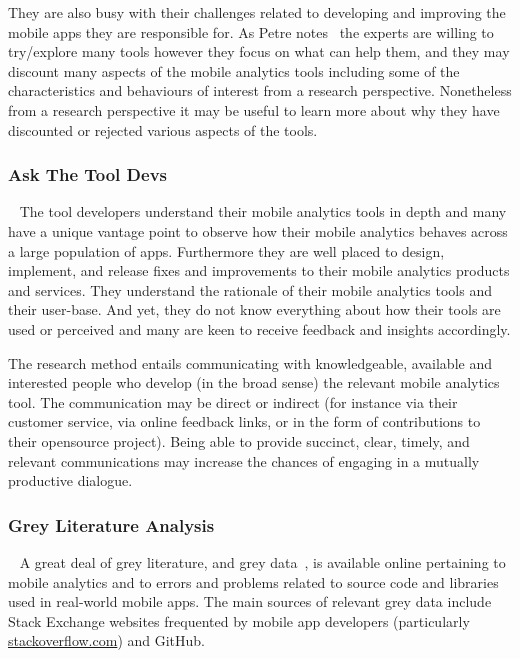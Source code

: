They are also busy with their challenges related to developing and improving the mobile apps they are responsible for. As Petre notes~\citealt{petre2009_insights_from_expert_software_design_practice} the experts are willing to try/explore many tools however they focus on what can help them, and they may discount many aspects of the mobile analytics tools including some of the characteristics and behaviours of interest from a research perspective. Nonetheless from a research perspective it may be useful to learn more about why they have discounted or rejected various aspects of the tools. 

\subsubsection{Ask The Tool Devs}~\label{section-ask-the-tool-devs-research-method} 
The tool developers understand their mobile analytics tools in depth and many have a unique vantage point to observe how their mobile analytics behaves across a large population of apps. Furthermore they are well placed to design, implement, and release fixes and improvements to their mobile analytics products and services. They understand the rationale of their mobile analytics tools and their user-base. And yet, they do not know everything about how their tools are used or perceived and many are keen to receive feedback and insights accordingly.

The research method entails communicating with knowledgeable, available and interested people who develop (in the broad sense) the relevant mobile analytics tool. The communication may be direct or indirect (for instance via their customer service, via online feedback links, or in the form of contributions to their opensource project). Being able to provide succinct, clear, timely, and relevant communications may increase the chances of engaging in a mutually productive dialogue.

\subsubsection{Grey Literature Analysis}~\label{section-grey-literature-analysis-research-method}   
A great deal of grey literature, and grey data~\citep[pp 219-221]{banks2010_blog_posts_and_tweets_the_next_frontier_for_grey_literature}, is available online pertaining to mobile analytics and to errors and problems related to source code and libraries used in real-world mobile apps. The main sources of relevant grey data include Stack Exchange websites frequented by mobile app developers (particularly \href{https://stackoverflow.com/}{stackoverflow.com}) and GitHub.

